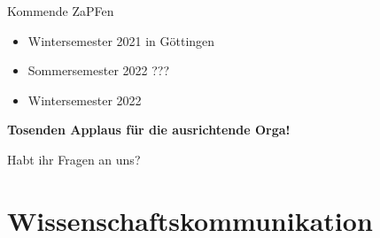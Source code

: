 \documentclass[compress, aspectratio=169]{beamer}
\begin{document}
\begin{frame}{Kommende ZaPFen}
  \begin{itemize}
    \item Wintersemester 2021 in Göttingen
    \item Sommersemester 2022 ???
    \item Wintersemester 2022 \textit{\color{blue}{bei euch?}}    
\end{itemize}
    \vspace{1cm}
    \begin{center}
      \huge \textbf{Tosenden Applaus für die ausrichtende Orga!}
    \end{center}
\end{frame}

\begin{frame}[plain]
  \begin{center}
    \Huge Habt ihr Fragen an uns?
    \end{center}
\end{frame}


\section{Wissenschaftskommunikation}
\end{document}
